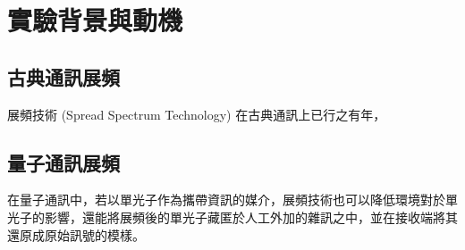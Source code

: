 \documentclass[class=NCU_thesis, crop=false]{standalone}
\begin{document}
\chapter{實驗背景與動機}
\section{古典通訊展頻}
展頻技術 (Spread Spectrum Technology) 在古典通訊上已行之有年，

\section{量子通訊展頻}
在量子通訊中，若以單光子作為攜帶資訊的媒介，展頻技術也可以降低環境對於單光子的影響，還能將展頻後的單光子藏匿於人工外加的雜訊之中，並在接收端將其還原成原始訊號的模樣。
\end{document}
